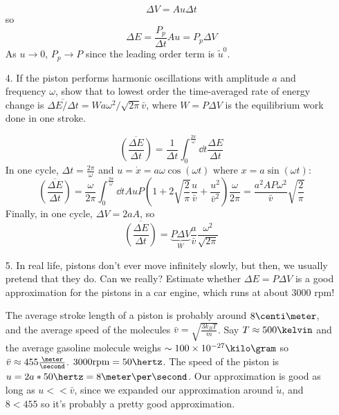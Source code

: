 \documentclass[a4paper,twoside]{article}
\begin{document}
\begin{itemize}
        \begin{problem}
            \begin{equation}
                \Delta V = Au \Delta t
            \end{equation}
            so
            \begin{equation}
                \Delta E = \frac{P_p}{\Delta t} A u = P_p \Delta V
            \end{equation}
            As $ u \to 0 $, $ P_p \to P $ since the leading order term is $ \tilde{u}^0 $.
        \end{problem}
    \item[4.] If the piston performs harmonic oscillations with amplitude $ a $ and frequency $ \omega $, show that to lowest order the time-averaged rate of energy change is $ \overline{\Delta E / \Delta t} = W a \omega^2 / \sqrt{2 \pi} \bar{v} $, where $ W = P \Delta V $ is the equilibrium work done in one stroke.
        \begin{problem}
            \begin{equation}
                \overline{\left( \frac{\Delta E}{\Delta t} \right)} = \frac{1}{\Delta t} \int_{0}^{\frac{2 \pi}{\omega}} \dd{t} \frac{\Delta E}{\Delta t}
            \end{equation}
            In one cycle, $ \Delta t = \frac{2 \pi}{\omega} $ and $ u = \dot{x} = a \omega \cos(\omega t) $ where $ x = a \sin(\omega t) $:
            \begin{equation}
                \overline{\left( \frac{\Delta E}{\Delta t} \right)} = \frac{\omega}{2 \pi} \int_{0}^{\frac{2 \pi}{\omega}} \dd{t} AuP\left( 1+ 2 \sqrt{\frac{2}{\pi}} \frac{u}{\bar{v}} + \frac{u^2}{\bar{v}^2} \right) \frac{\omega}{2 \pi} = \frac{a^2AP\omega^2}{\bar{v}} \sqrt{\frac{2}{\pi}} 
            \end{equation}
            Finally, in one cycle, $ \Delta V = 2 a A $, so
            \begin{equation}
                \overline{\left( \frac{\Delta E}{\Delta t} \right)} = \underbrace{P \Delta V}_{W} \frac{a}{\bar{v}} \frac{\omega^2}{\sqrt{2 \pi}}
            \end{equation}
        \end{problem}
    \item[5.] In real life, pistons don't ever move infinitely slowly, but then, we usually pretend that they do. Can we really? Estimate whether $ \Delta E = P \Delta V $ is a good approximation for the pistons in a car engine, which runs at about $ 3000 $ rpm!
        \begin{problem}
            The average stroke length of a piston is probably around $ 8\centi\meter $, and the average speed of the molecules $ \bar{v} = \sqrt{\frac{3 k_B T}{m}} $. Say $ T \approx 500\kelvin $ and the average gasoline molecule weighs $ \sim 100\times 10^{-27}\kilo\gram $ so $ \bar{v} \approx 455\frac{\meter}{\second} $. $ 3000\text{rpm} = 50\hertz $. The speed of the piston is $ u = 2a*50\hertz = 8\meter\per\second $. Our approximation is good as long as $  u << \bar{v} $, since we expanded our approximation around $ \tilde{u} $, and $ 8 < 455 $ so it's probably a pretty good approximation.
        \end{problem}
\end{itemize}
\end{document}
